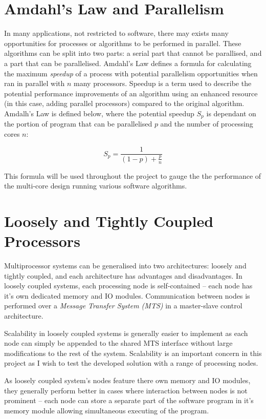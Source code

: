 \documentclass[11pt,a4paper]{report}
\begin{document}
{\section{Amdahl's Law and Parallelism}
In many applications, not restricted to software, there may exists many opportunities for processes or algorithms to be performed in parallel. These algorithms can be split into two parts: a serial part that cannot be parallised, and a part that can be parallelised. Amdahl's Law defines a formula for calculating the maximum \textit{speedup} of a process with potential parallelism opportunities when ran in parallel with $n$ many processors. Speedup is a term used to describe the potential performance improvements of an algorithm using an enhanced resource (in this case, adding parallel processors) compared to the original algorithm. Amdalh's Law is defined below, where the potential speedup $S_p$ is dependant on the portion of program that can be parallelised $p$ and the number of processing cores $n$:

\begin{equation}
S_{p} = \frac{1}{(1-p)+\frac{p}{n}}
\label{eq:amdahl}
\end{equation}

This formula will be used throughout the project to gauge the the performance of the multi-core design running various software algorithms.

\section{Loosely and Tightly Coupled Processors}
Multiprocessor systems can be generalised into two architectures: loosely and tightly coupled, and each architecture has advantages and disadvantages. 
In loosely coupled systems, each processing node is self-contained -- each node has it's own dedicated memory and IO modules. Communication between nodes is performed over a \textit{Message Transfer System (MTS)} \cite{preeti_aritra_2017}  in a master-slave control architecture.

Scalability in loosely coupled systems is generally easier to implement as each node can simply be appended to the shared MTS interface without large modifications to the rest of the system. Scalability is an important concern in this project as I wish to test the developed solution with a range of processing nodes.

As loosely coupled system's nodes feature there own memory and IO modules, they generally perform better in cases where interaction between nodes is not prominent -- each node can store a separate part of the software program in it's memory module allowing simultaneous executing of the program.

}
\end{document}
